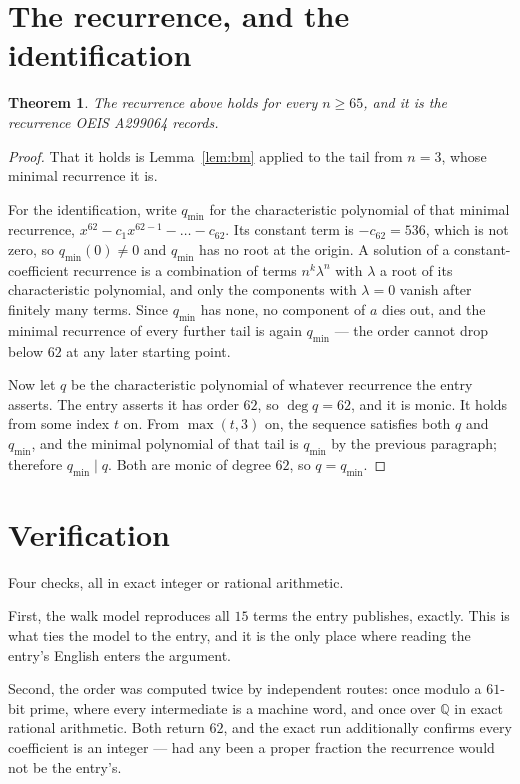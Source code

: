 \documentclass[11pt,a4paper]{article}
\theoremstyle{plain}
\newtheorem{theorem}{Theorem}
\theoremstyle{definition}
\begin{document}
\section{The recurrence, and the identification}

\begin{theorem}
The recurrence above holds for every $n\ge65$, and it is the recurrence OEIS A299064 records.
\end{theorem}

\begin{proof}
That it holds is Lemma~\ref{lem:bm} applied to the tail from $n=3$, whose minimal
recurrence it is.

For the identification, write $q_{\min}$ for the characteristic polynomial of that minimal
recurrence, $x^{62}-c_1x^{62-1}-\dots-c_{62}$. Its constant term is
$-c_{62}=536$, which is not zero, so $q_{\min}(0)\neq0$ and $q_{\min}$ has no
root at the origin. A solution of a constant-coefficient recurrence is a combination of terms
$n^{k}\lambda^{n}$ with $\lambda$ a root of its characteristic polynomial, and only the
components with $\lambda=0$ vanish after finitely many terms. Since $q_{\min}$ has none, no
component of $a$ dies out, and the minimal recurrence of every further tail is again
$q_{\min}$ --- the order cannot drop below $62$ at any later starting point.

Now let $q$ be the characteristic polynomial of whatever recurrence the entry asserts. The
entry asserts it has order $62$, so $\deg q=62$, and it is monic. It holds from some
index $t$ on. From $\max(t,3)$ on, the sequence satisfies both $q$ and $q_{\min}$, and
the minimal polynomial of that tail is $q_{\min}$ by the previous paragraph; therefore
$q_{\min}\mid q$. Both are monic of degree $62$, so $q=q_{\min}$.
\end{proof}

\section{Verification}

Four checks, all in exact integer or rational arithmetic.

First, the walk model reproduces all $15$ terms the entry publishes, exactly. This is
what ties the model to the entry, and it is the only place where reading the entry's English
enters the argument.

Second, the order was computed twice by independent routes: once modulo a $61$-bit prime, where
every intermediate is a machine word, and once over $\mathbb{Q}$ in exact rational arithmetic.
Both return $62$, and the exact run additionally confirms every coefficient is an integer
--- had any been a proper fraction the recurrence would not be the entry's.
\end{document}
